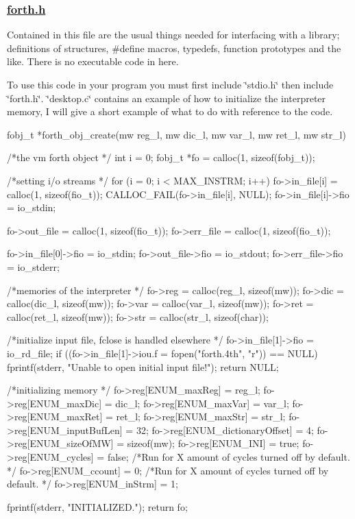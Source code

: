\subsubsection*{\hyperlink{forth_8h}{forth.\-h}}

Contained in this file are the usual things needed for interfacing with a library; definitions of structures, \#define macros, typedefs, function prototypes and the like. There is no executable code in here.

To use this code in your program you must first include \char`\"{}stdio.\-h\char`\"{} then include \char`\"{}forth.\-h\char`\"{}. \char`\"{}desktop.\-c\char`\"{} contains an example of how to initialize the interpreter memory, I will give a short example of what to do with reference to the code. \begin{DoxyVerb}fobj_t *forth_obj_create(mw reg_l, mw dic_l, mw var_l, mw ret_l, mw str_l)
{
    /*the vm forth object */
    int i = 0;
    fobj_t *fo = calloc(1, sizeof(fobj_t));

    /*setting i/o streams */
    for (i = 0; i < MAX_INSTRM; i++) {
            fo->in_file[i] = calloc(1, sizeof(fio_t));
            CALLOC_FAIL(fo->in_file[i], NULL);
            fo->in_file[i]->fio = io_stdin;
    }

    fo->out_file = calloc(1, sizeof(fio_t));
    fo->err_file = calloc(1, sizeof(fio_t));

    fo->in_file[0]->fio = io_stdin;
    fo->out_file->fio = io_stdout;
    fo->err_file->fio = io_stderr;

    /*memories of the interpreter */
    fo->reg = calloc(reg_l, sizeof(mw));
    fo->dic = calloc(dic_l, sizeof(mw));
    fo->var = calloc(var_l, sizeof(mw));
    fo->ret = calloc(ret_l, sizeof(mw));
    fo->str = calloc(str_l, sizeof(char));

    /*initialize input file, fclose is handled elsewhere */
    fo->in_file[1]->fio = io_rd_file;
    if ((fo->in_file[1]->iou.f = fopen("forth.4th", "r")) == NULL) {
            fprintf(stderr, "Unable to open initial input file!\n");
            return NULL;
    }

    /*initializing memory */
    fo->reg[ENUM_maxReg] = reg_l;
    fo->reg[ENUM_maxDic] = dic_l;
    fo->reg[ENUM_maxVar] = var_l;
    fo->reg[ENUM_maxRet] = ret_l;
    fo->reg[ENUM_maxStr] = str_l;
    fo->reg[ENUM_inputBufLen] = 32;
    fo->reg[ENUM_dictionaryOffset] = 4;
    fo->reg[ENUM_sizeOfMW] = sizeof(mw);
    fo->reg[ENUM_INI] = true;
    fo->reg[ENUM_cycles] = false;   /*Run for X amount of cycles turned off by default. */
    fo->reg[ENUM_ccount] = 0;       /*Run for X amount of cycles turned off by default. */
    fo->reg[ENUM_inStrm] = 1;

    fprintf(stderr, "\tOBJECT INITIALIZED.\n");
    return fo;
}
\end{DoxyVerb}


